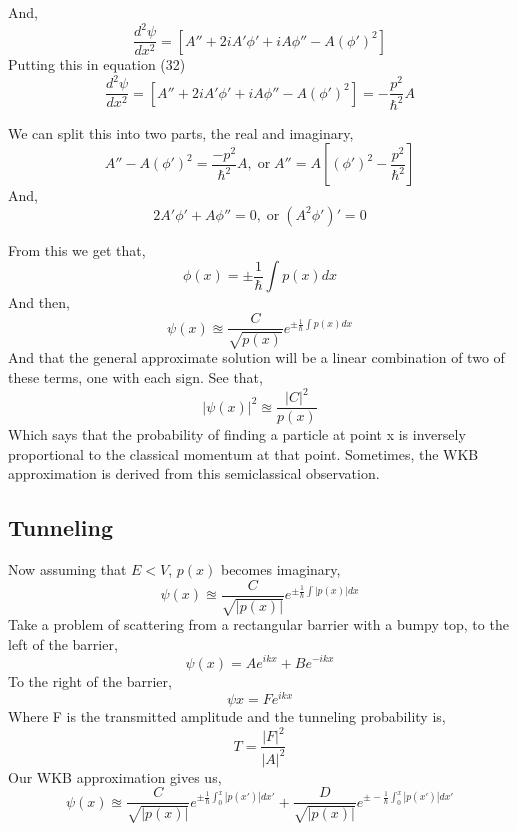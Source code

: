 And,
\begin{equation}
	\frac{d^2\psi}{dx^2}=[A''+2iA'\phi'+iA\phi''-A(\phi')^2]
\end{equation}
Putting this in equation (32)
\begin{equation}
	\frac{d^2\psi}{dx^2}=[A''+2iA'\phi'+iA\phi''-A(\phi')^2]= -\frac{p^2}{\hbar^2}A
\end{equation}

We can split this into two parts, the real and imaginary,
\begin{equation}
	A''-A(\phi')^2=\frac{-p^2}{\hbar^2}A, \; \text{or} \; A''=A\left[(\phi')^2-\frac{p^2}{\hbar^2}\right]
\end{equation}
And,
\begin{equation}
	2A'\phi'+ A\phi''=0, \; \text{or} \; (A^2\phi')'=0
\end{equation}

From this we get that,
\begin{equation}
	\phi(x)=\pm\frac{1}{\hbar}\int p(x)dx
\end{equation}
And then,
\begin{equation}
	\psi(x)\approxeq\frac{C}{\sqrt{p(x)}}e^{\pm \frac{1}{\hbar}\int p(x)dx}
\end{equation}
And that the general approximate solution will be a linear combination of two of these terms, one with each sign. See that,
\begin{equation}
	|\psi(x)|^2\approxeq\frac{|C|^2}{p(x)}
\end{equation}
Which says that the probability of finding a particle at point x is inversely proportional to the classical momentum at that point. Sometimes, the WKB approximation is derived from this semiclassical observation.

\subsection{Tunneling}
Now assuming that $E<V$, $p(x)$ becomes imaginary,
\begin{equation}
	\psi(x)\approxeq\frac{C}{\sqrt{|p(x)|}}e^{\pm \frac{1}{\hbar}\int |p(x)|dx}
\end{equation}
Take a problem of scattering from a rectangular barrier with a bumpy top, to the left of the barrier,
\begin{equation}
	\psi(x)=Ae^{ikx}+Be^{-ikx}
\end{equation}
To the right of the barrier,
\begin{equation}
	\psi{x}=Fe^{ikx}
\end{equation}
Where F is the transmitted amplitude and the tunneling probability is,
\begin{equation}
	T=\frac{|F|^2}{|A|^2}
\end{equation}
Our WKB approximation gives us,
\begin{equation}
	\psi(x)\approxeq \frac{C}{\sqrt{|p(x)|}}e^{\pm \frac{1}{\hbar}\int_{0}^{x} |p(x')|dx'} +\frac{D}{\sqrt{|p(x)|}}e^{\pm -\frac{1}{\hbar}\int_{0}^{x} |p(x')|dx'}
\end{equation}

